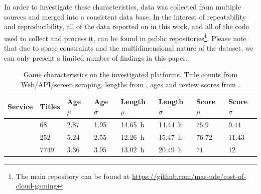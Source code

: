 In order to investigate these characteristics, data was collected from multiple sources and merged into a consistent data base. In the interest of repeatability and reproducibility, all of the data reported on in this work, and all of the code used to collect and process it, can be found in public repositories\footnote{The main repository can be found at \url{https://github.com/mas-ude/cost-of-cloud-gaming}}. Please note that due to space constraints and the multidimensional nature of the dataset, we can only present a limited number of findings in this paper.



% 
% 


\begin{table}
\centering
\caption{Game characteristics on the investigated platforms. Title counts from Web/API/screen scraping, lengths from \hltb, ages and review scores from \metacritic.}
\label{tab:game-stats}
	\begin{tabu}{X[2]|X[r]X[r]X[r]X[r]X[r]X[r]X[r]}
	\toprule
	Service & Titles & Age $\mu$ & Age $\sigma$ & Length $\mu$ & Length $\sigma$ & Score $\mu$ & Score $\sigma$ \\
	\midrule
	\gfnow & $68$ & \SI{2.87}{\year} & \SI{1.95}{\year} & \SI{14.65}{\hour} & \SI{14.44}{\hour} & $75.9$ & $9.44$ \\
	\psnow & $252$ & \SI{5.24}{\year} & \SI{2.55}{\year} & \SI{12.26}{\hour} & \SI{15.47}{\hour} & $76.72$ & $11.43$ \\
	\steam & $7749$ & \SI{3.36}{\year} & \SI{3.95}{\year} & \SI{13.02}{\hour} & \SI{20.49}{\hour} & $71$ & $12$ \\
	\bottomrule
	\end{tabu}
\end{table}


